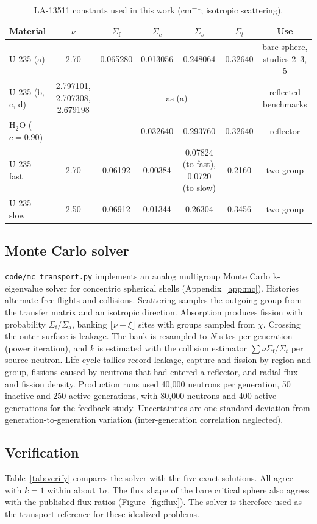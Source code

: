 \documentclass[11pt,letterpaper]{article}
\newcommand{\Sig}[1]{\Sigma_\mathrm{#1}}
\begin{document}
\begin{table}[ht]
\centering
\caption[Benchmark cross sections]{LA-13511 constants used in this work (\si{cm^{-1}}; isotropic scattering).}
\label{tab:xs}
\small
\begin{tabular}{@{}lcccccc@{}}
\toprule
Material & $\nu$ & $\Sig{f}$ & $\Sigma_c$ & $\Sigma_s$ & $\Sigma_t$ & Use \\
\midrule
U-235 (a) & 2.70 & 0.065280 & 0.013056 & 0.248064 & 0.32640 & bare sphere, studies 2--3, 5 \\
U-235 (b, c, d) & 2.797101, 2.707308, 2.679198 & \multicolumn{4}{c}{as (a)} & reflected benchmarks \\
H$_2$O ($c=0.90$) & -- & -- & 0.032640 & 0.293760 & 0.32640 & reflector \\
\midrule
U-235 fast & 2.70 & 0.06192 & 0.00384 & 0.07824 (to fast), 0.0720 (to slow) & 0.2160 & two-group \\
U-235 slow & 2.50 & 0.06912 & 0.01344 & 0.26304 & 0.3456 & two-group \\
\bottomrule
\end{tabular}
\end{table}

\subsection{Monte Carlo solver}
\texttt{code/mc_transport.py} implements an analog multigroup Monte Carlo k-eigenvalue solver for concentric spherical shells (Appendix~\ref{app:mc}). Histories alternate free flights and collisions. Scattering samples the outgoing group from the transfer matrix and an isotropic direction. Absorption produces fission with probability $\Sig{f}/\Sig{a}$, banking $\lfloor\nu + \xi\rfloor$ sites with groups sampled from $\chi$. Crossing the outer surface is leakage. The bank is resampled to $N$ sites per generation (power iteration), and $k$ is estimated with the collision estimator $\sum\nu\Sig{f}/\Sigma_t$ per source neutron. Life-cycle tallies record leakage, capture and fission by region and group, fissions caused by neutrons that had entered a reflector, and radial flux and fission density. Production runs used 40{,}000 neutrons per generation, 50 inactive and 250 active generations, with 80{,}000 neutrons and 400 active generations for the feedback study. Uncertainties are one standard deviation from generation-to-generation variation (inter-generation correlation neglected).

\subsection{Verification}
Table~\ref{tab:verify} compares the solver with the five exact solutions. All agree with $k = 1$ within about $1\sigma$. The flux shape of the bare critical sphere also agrees with the published flux ratios (Figure~\ref{fig:flux}). The solver is therefore used as the transport reference for these idealized problems.
\end{document}
